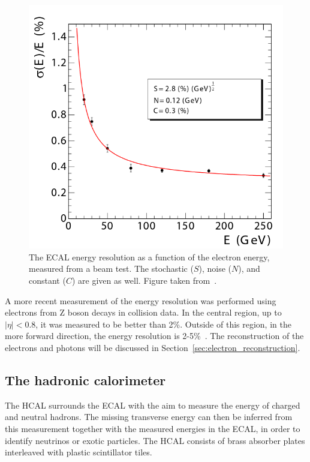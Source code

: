 \begin{figure}[ht]
 \centering
 \includegraphics[width = .55\textwidth]{ecal_res}
\caption{The \ac{ECAL} energy resolution as a function of the electron energy, measured from a beam test. The stochastic ($S$), noise ($N$), and constant ($C$) are given as well. Figure taken from~\cite{Chatrchyan:2008aa}.}
\label{fig:ecal_res}
\end{figure}

A more recent measurement of the energy resolution was performed using electrons from Z boson decays in collision data. In the central region, up to $|\eta| < 0.8$, it was measured to be better than 2\%. Outside of this region, in the more forward direction, the energy resolution is 2-5\%~\cite{Chatrchyan:2013dga}. The reconstruction of the electrons and photons will be discussed in Section~\ref{sec:electron_reconstruction}.

\subsection{The hadronic calorimeter}

The \acf{HCAL} surrounds the \ac{ECAL} with the aim to measure the energy of charged and neutral hadrons. The missing transverse energy can then be inferred from this measurement together with the measured energies in the \ac{ECAL}, in order to identify neutrinos or exotic particles. The \ac{HCAL} consists of brass absorber plates interleaved with plastic scintillator tiles.


